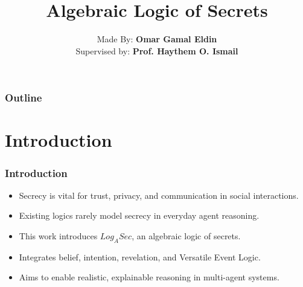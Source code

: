 \documentclass[aspectratio=169]{beamer}
\title{\Huge \textbf{Algebraic Logic of Secrets}}
\author{Made By: \textbf{Omar Gamal Eldin}\\Supervised by: \textbf{Prof. Haythem O. Ismail}}
\institute{}
\date{}
\begin{document}
\frame{\titlepage}


\begin{frame}
\frametitle{Outline}
\tableofcontents[hideallsubsections]
\end{frame}


\section{Introduction}
\begin{frame}
\frametitle{Introduction}
\Large
\begin{itemize}
    \item Secrecy is vital for trust, privacy, and communication in social interactions.
    \item Existing logics rarely model secrecy in everyday agent reasoning.
    \item This work introduces $Log_ASec$, an algebraic logic of secrets.
    \item Integrates belief, intention, revelation, and Versatile Event Logic.
    \item Aims to enable realistic, explainable reasoning in multi-agent systems.
\end{itemize}
\end{frame}

\end{document}
